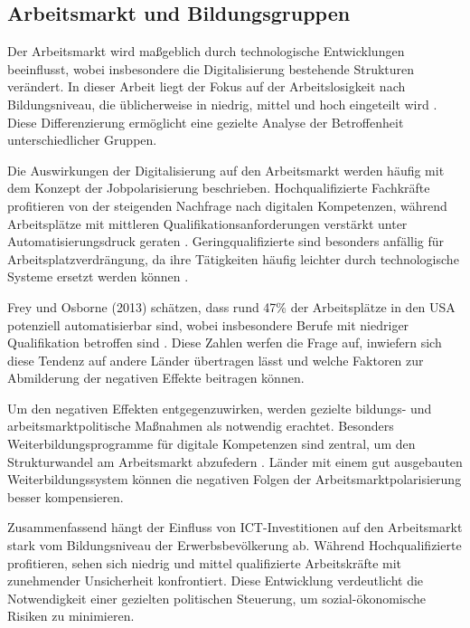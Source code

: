 
\subsection{Arbeitsmarkt und Bildungsgruppen}

Der Arbeitsmarkt wird maßgeblich durch technologische Entwicklungen beeinflusst,
wobei insbesondere die Digitalisierung bestehende Strukturen verändert. In dieser
Arbeit liegt der Fokus auf der Arbeitslosigkeit nach Bildungsniveau, die üblicherweise
in niedrig, mittel und hoch eingeteilt wird \parencite[vgl.][S. 35–37]{frey2013thefuture}.
Diese Differenzierung ermöglicht eine gezielte Analyse der Betroffenheit
unterschiedlicher Gruppen.

Die Auswirkungen der Digitalisierung auf den Arbeitsmarkt werden häufig mit dem
Konzept der Jobpolarisierung beschrieben. Hochqualifizierte Fachkräfte profitieren
von der steigenden Nachfrage nach digitalen Kompetenzen, während Arbeitsplätze mit
mittleren Qualifikationsanforderungen verstärkt unter Automatisierungsdruck geraten
\parencite[vgl.][S. 40]{autor2015whyare}. Geringqualifizierte sind besonders anfällig
für Arbeitsplatzverdrängung, da ihre Tätigkeiten häufig leichter durch technologische
Systeme ersetzt werden können \parencite[vgl.][S. 10]{acemoglu2002technical}.

Frey und Osborne (2013) schätzen, dass rund 47\% der Arbeitsplätze in den USA
potenziell automatisierbar sind, wobei insbesondere Berufe mit niedriger Qualifikation
betroffen sind \parencite[vgl.][S. 14–15]{frey2013thefuture}. Diese Zahlen werfen die
Frage auf, inwiefern sich diese Tendenz auf andere Länder übertragen lässt und welche
Faktoren zur Abmilderung der negativen Effekte beitragen können.

Um den negativen Effekten entgegenzuwirken, werden gezielte bildungs- und
arbeitsmarktpolitische Maßnahmen als notwendig erachtet. Besonders
Weiterbildungsprogramme für digitale Kompetenzen sind zentral, um den
Strukturwandel am Arbeitsmarkt abzufedern \parencite[vgl.][S. 75]{brynjolfsson2014thesecond}.
Länder mit einem gut ausgebauten Weiterbildungssystem können die negativen Folgen
der Arbeitsmarktpolarisierung besser kompensieren.

Zusammenfassend hängt der Einfluss von \ac{ICT}-Investitionen auf den Arbeitsmarkt
stark vom Bildungsniveau der Erwerbsbevölkerung ab. Während Hochqualifizierte
profitieren, sehen sich niedrig und mittel qualifizierte Arbeitskräfte mit zunehmender
Unsicherheit konfrontiert. Diese Entwicklung verdeutlicht die Notwendigkeit einer
gezielten politischen Steuerung, um sozial-ökonomische Risiken zu minimieren.

